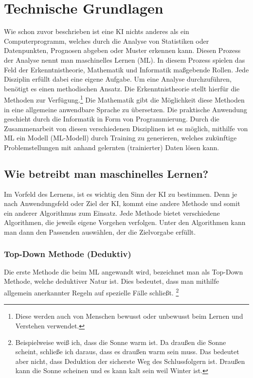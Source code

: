 \documentclass[12pt,german,ngerman]{report}
\begin{document}
\chapter{Technische Grundlagen}
     Wie schon zuvor beschrieben ist eine KI nichts anderes als ein Computerprogramm,
     welches durch die Analyse von Statistiken oder Datenpunkten, Prognosen abgeben oder Muster erkennen kann.
     Diesen Prozess der Analyse nennt man maschinelles Lernen (ML).
     In diesem Prozess spielen das Feld der Erkenntnistheorie, Mathematik und Informatik 
     maßgebende Rollen. Jede Disziplin erfüllt dabei eine eigene Aufgabe.
     Um eine Analyse durchzuführen, benötigt es einen methodischen Ansatz.
     Die Erkenntnistheorie stellt hierfür die Methoden zur Verfügung.\footnote{Diese werden auch von 
     Menschen bewusst oder unbewusst beim Lernen und Verstehen verwendet.}
     Die Mathematik gibt die Möglichkeit diese Methoden in eine allgemeine anwendbare Sprache zu übersetzen.
     Die praktische Anwendung geschieht durch die Informatik in Form von Programmierung.
     Durch die Zusammenarbeit von diesen verschiedenen Disziplinen ist es
     möglich, mithilfe von ML ein Modell (ML-Modell) durch Training zu generieren,
     welches zukünftige Problemstellungen mit anhand gelernten (trainierter) Daten lösen kann.
        
    \section{Wie betreibt man maschinelles Lernen?}
        Im Vorfeld des Lernens, ist es wichtig den Sinn der KI zu bestimmen.
        Denn je nach Anwendungsfeld oder Ziel der KI, kommt eine andere Methode und somit
        ein anderer Algorithmus zum Einsatz. Jede Methode bietet verschiedene Algorithmen,
        die jeweils eigene Vorgehen verfolgen. Unter den Algorithmen kann man
        dann den Passenden auswählen, der die Zielvorgabe erfüllt.

    \newpage    

    \subsection{Top-Down Methode (Deduktiv)}
        Die erste Methode die beim ML angewandt wird, bezeichnet man als Top-Down Methode,
        welche deduktiver Natur ist. Dies bedeutet, dass man mithilfe  allgemein anerkannter Regeln
        auf spezielle Fälle schließt.\cite{dundi2021unileipzig} 
        \footnote{Beispielweise weiß ich, dass die Sonne warm ist. Da draußen die Sonne scheint, schließe ich daraus,
        dass es draußen warm sein muss. Das bedeutet aber nicht, dass Deduktion der sicherste Weg des 
        Schlussfolgern ist. Draußen kann die Sonne scheinen und es kann kalt sein weil Winter ist.}\\
\end{document}

